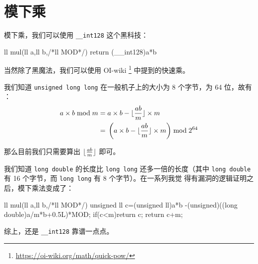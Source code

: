 
\section{模下乘}\label{sec:模下乘}
模下乘，我们可以使用 \verb|__int128| 这个黑科技：
\begin{Cpp}
ll mul(ll a,ll b,/*ll MOD*/){
    return (__int128)a*b%
}
\end{Cpp}

当然除了黑魔法，我们可以使用 OI-wiki%
\footnote{\url{https://oi-wiki.org/math/quick-pow/}} 中提到的快速乘。

我们知道 \verb|unsigned long long| 在一般机子上的大小为 8 个字节，为 64 位，故有
：$$\begin{aligned}
    a \times b \bmod m ={}& a \times b - \lfloor{ab \over m}\rfloor \times m \\
        ={}& \left(a \times b - \lfloor{ab \over m}\rfloor \times m\right) \bmod 2^{64} \\
\end{aligned}$$

那么目前我们只需要算出 $\lfloor{ab \over m}\rfloor$ 即可。

我们知道 \verb|long double| 的长度比 \verb|long long| 还多一倍的长度（其中
\verb|long double| 有 16 个字节，而 \verb|long long| 有 8 个字节）。在一系列我觉
得有漏洞的逻辑证明之后，模下乘法变成了：
\begin{Cpp}
ll mul(ll a,ll b,/*ll MOD*/){
    unsigned ll c=(unsigned ll)a*b
                 -(unsigned)((long double)a/m*b+0.5L)*MOD;
    if(c<m)return c;
    return c+m;
}
\end{Cpp}

综上，还是 \verb|__int128| 靠谱一点点。


